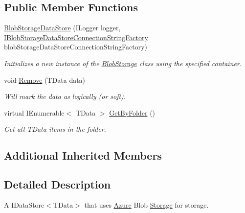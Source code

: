 \subsection*{Public Member Functions}
\begin{DoxyCompactItemize}
\item 
\hyperlink{classCqrs_1_1Azure_1_1BlobStorage_1_1DataStores_1_1BlobStorageDataStore_aacea885f6a1d38921b99feb898fc33c2_aacea885f6a1d38921b99feb898fc33c2}{Blob\+Storage\+Data\+Store} (I\+Logger logger, \hyperlink{interfaceCqrs_1_1Azure_1_1BlobStorage_1_1DataStores_1_1IBlobStorageDataStoreConnectionStringFactory}{I\+Blob\+Storage\+Data\+Store\+Connection\+String\+Factory} blob\+Storage\+Data\+Store\+Connection\+String\+Factory)
\begin{DoxyCompactList}\small\item\em Initializes a new instance of the \hyperlink{namespaceCqrs_1_1Azure_1_1BlobStorage}{Blob\+Storage} class using the specified container. \end{DoxyCompactList}\item 
void \hyperlink{classCqrs_1_1Azure_1_1BlobStorage_1_1DataStores_1_1BlobStorageDataStore_af054d4134671d66981c4d91df5c1d481_af054d4134671d66981c4d91df5c1d481}{Remove} (T\+Data data)
\begin{DoxyCompactList}\small\item\em Will mark the {\itshape data}  as logically (or soft). \end{DoxyCompactList}\item 
virtual I\+Enumerable$<$ T\+Data $>$ \hyperlink{classCqrs_1_1Azure_1_1BlobStorage_1_1DataStores_1_1BlobStorageDataStore_a611a374a549ef987d0ff59bd84ea1a4b_a611a374a549ef987d0ff59bd84ea1a4b}{Get\+By\+Folder} ()
\begin{DoxyCompactList}\small\item\em Get all {\itshape T\+Data}  items in the folder. \end{DoxyCompactList}\end{DoxyCompactItemize}
\subsection*{Additional Inherited Members}


\subsection{Detailed Description}
A I\+Data\+Store$<$\+T\+Data$>$ that uses \hyperlink{namespaceCqrs_1_1Azure}{Azure} Blob \hyperlink{namespaceCqrs_1_1Azure_1_1Storage}{Storage} for storage. 


